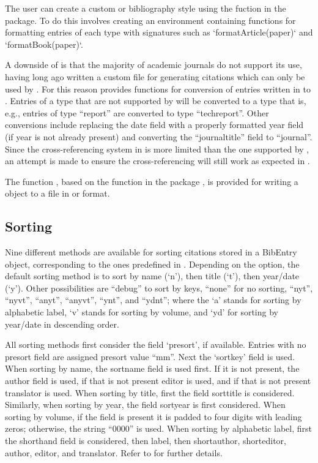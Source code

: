 \documentclass[article]{jss}\usepackage[]{graphicx}\usepackage[]{color}
\newcommand{\ourpkg}{\pkg{RefManageR}}
\begin{document}
The user can create a custom \Biblatex{} or \Bibtex{} bibliography style using the  fuction in the  package.  To do this involves creating an environment containing functions for formatting entries of each type with signatures such as `formatArticle(paper)` and `formatBook(paper)`.

A downside of \Biblatex{} is that the majority of academic journals do not support its use, having long ago written a custom  file for generating citations which can only be used by \Bibtex{}.  For this reason \ourpkg{} provides functions for conversion of entries written in \Biblatex{} to \Bibtex{}.  Entries of a type that are not supported by \Bibtex{} will be converted to a type that is, e.g., entries of type ``report'' are converted to type ``techreport''.  Other conversions include replacing the date field with a properly formatted year field (if year is not already present) and converting the ``journaltitle'' field to ``journal''.  Since the cross-referencing system in \Bibtex{} is more limited than the one supported by \Biblatex{}, an attempt is made to ensure the cross-referencing will still work as expected in \Bibtex{}.

The function , based on the function  in the package  \citep{Rbibtex}, is provided for writing a  object to a  file in \Biblatex{} or \Bibtex{} format.
\subsection{Sorting}
Nine different methods are available for sorting citations stored in a BibEntry object, corresponding to the ones predefined in \Biblatex{}.  Depending on the  option, the default sorting method is  to sort by name (`n'), then title (`t'), then year/date (`y').  Other possibilities are ``debug'' to sort by keys, ``none'' for no sorting, ``nyt'', ``nyvt'', ``anyt'', ``anyvt'', ``ynt'', and ``ydnt''; where the `a' stands for sorting by alphabetic label, `v' stands for sorting by volume, and `yd' for sorting by year/date in descending order.

All sorting methods first consider the field `presort', if available. Entries with no presort field are assigned presort value ``mm''. Next the `sortkey' field is used.  When sorting by name, the sortname field is used first. If it is not present, the author field is used, if that is not present editor is used, and if that is not present translator is used.  When sorting by title, first the field sorttitle is considered. Similarly, when sorting by year, the field sortyear is first considered.  When sorting by volume, if the field is present it is padded to four digits with leading zeros; otherwise, the string ``0000'' is used.  When sorting by alphabetic label, first the shorthand field is considered, then label, then shortauthor, shorteditor, author, editor, and translator. Refer to \citet[Sections~3.1.2.1 and 3.5 and Appendix~C.2][]{biblatex} for further details.
\end{document}

